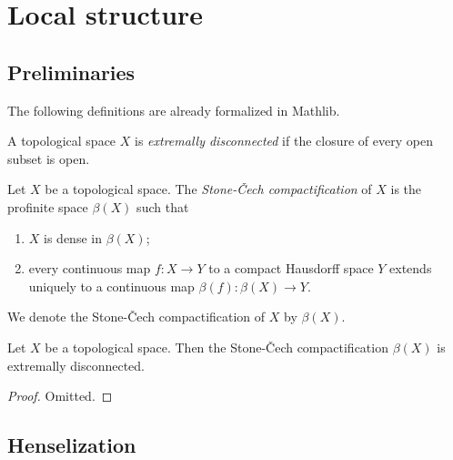 \chapter{Local structure}

\section{Preliminaries}

The following definitions are already formalized in Mathlib.

\begin{definition}
    \label{def:extremally-disconnected}
    \mathlibok

    A topological space \(X\) is \emph{extremally disconnected} if the closure of every open subset is open.
\end{definition}

\begin{definition} 
    \label{def:stone-cech-compactification}
    \mathlibok

    Let \(X\) be a topological space. The \emph{Stone-Čech compactification} of \(X\) is the
    profinite space \(\beta(X)\) such that
    \begin{enumerate}
        \item \(X\) is dense in \(\beta(X)\);
        \item every continuous map \(f: X \to Y\) to a compact Hausdorff space \(Y\)
            extends uniquely to a continuous map \(\beta(f): \beta(X) \to Y\).
    \end{enumerate}
    We denote the Stone-Čech compactification of \(X\) by \(\beta(X)\).
\end{definition}

\begin{theorem}
    Let \(X\) be a topological space. Then the Stone-Čech compactification \(\beta(X)\) is extremally disconnected.
    \label{thm:stone-cech-extremally-disconnected}
    \mathlibok
\end{theorem}

\begin{proof}
    Omitted.
\end{proof}

\section{Henselization}


